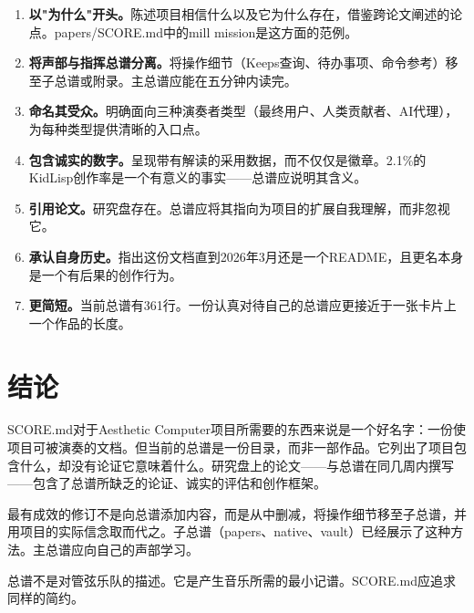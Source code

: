 \documentclass[10pt,letterpaper,twocolumn]{article}
\begin{document}
\begin{enumerate}
\item \textbf{以"为什么"开头。}陈述项目相信什么以及它为什么存在，借鉴跨论文阐述的论点。papers/SCORE.md中的mill mission是这方面的范例。
\item \textbf{将声部与指挥总谱分离。}将操作细节（Keeps查询、待办事项、命令参考）移至子总谱或附录。主总谱应能在五分钟内读完。
\item \textbf{命名其受众。}明确面向三种演奏者类型（最终用户、人类贡献者、AI代理），为每种类型提供清晰的入口点。
\item \textbf{包含诚实的数字。}呈现带有解读的采用数据，而不仅仅是徽章。2.1\%的KidLisp创作率是一个有意义的事实——总谱应说明其含义。
\item \textbf{引用论文。}研究盘存在。总谱应将其指向为项目的扩展自我理解，而非忽视它。
\item \textbf{承认自身历史。}指出这份文档直到2026年3月还是一个README，且更名本身是一个有后果的创作行为。
\item \textbf{更简短。}当前总谱有361行。一份认真对待自己的总谱应更接近于一张卡片上一个作品的长度。
\end{enumerate}

\section{结论}

SCORE.md对于Aesthetic Computer项目所需要的东西来说是一个好名字：一份使项目可被演奏的文档。但当前的总谱是一份目录，而非一部作品。它列出了项目包含什么，却没有论证它意味着什么。研究盘上的论文——与总谱在同几周内撰写——包含了总谱所缺乏的论证、诚实的评估和创作框架。

最有成效的修订不是向总谱添加内容，而是从中删减，将操作细节移至子总谱，并用项目的实际信念取而代之。子总谱（papers、native、vault）已经展示了这种方法。主总谱应向自己的声部学习。

总谱不是对管弦乐队的描述。它是产生音乐所需的最小记谱。SCORE.md应追求同样的简约。



\end{document}
